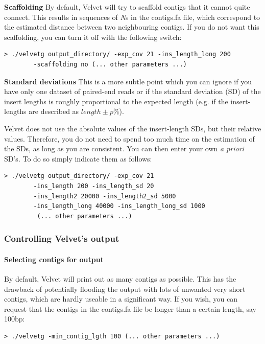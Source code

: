 \documentclass{article}
\begin{document}
\textbf{Scaffolding} By default, Velvet will try to scaffold contigs that it cannot quite connect. This results in sequences of \emph{N}s in the contigs.fa file, which correspond to the estimated distance between two neighbouring contigs. If you do not want this scaffolding, you can turn it off with the following switch:

\begin{verbatim}
> ./velvetg output_directory/ -exp_cov 21 -ins_length_long 200
		-scaffolding no (... other parameters ...)
\end{verbatim}

\textbf{Standard deviations} This is a more subtle point which you can ignore if you have only one dataset of paired-end reads or if the standard deviation (SD) of the insert lengths is roughly proportional to the expected length (e.g. if the insert-lengths are described as $length \pm p\%$).

Velvet does not use the absolute values of the insert-length SDs, but their relative values. Therefore, you do not need to spend too much time on the estimation of the SDs, as long as you are consistent. You can then enter your own \emph{a priori} SD's. To do so simply indicate them as follows:

\begin{verbatim}
> ./velvetg output_directory/ -exp_cov 21 
		-ins_length 200 -ins_length_sd 20
		-ins_length2 20000 -ins_length2_sd 5000
		-ins_length_long 40000 -ins_length_long_sd 1000
		 (... other parameters ...)
\end{verbatim}

	\subsubsection{Controlling Velvet's output}

	\paragraph{Selecting contigs for output}

By default, Velvet will print out as many contigs as possible. This has the drawback of potentially flooding the output with lots of unwanted very short contigs, which are hardly useable in a significant way. If you wish, you can request that the contigs in the contigs.fa file be longer than a certain length, say 100bp:

\begin{verbatim}
> ./velvetg -min_contig_lgth 100 (... other parameters ...)
\end{verbatim}
\end{document}
